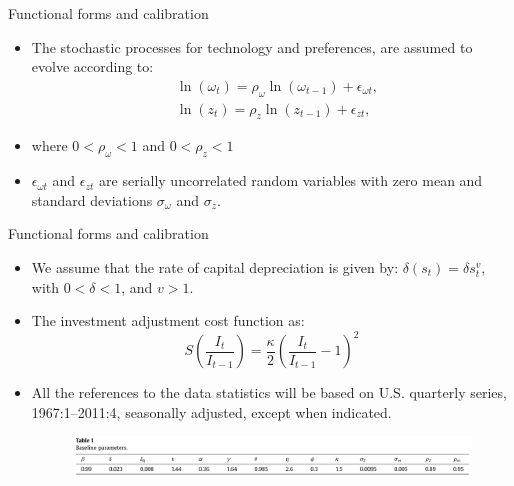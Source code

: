 \documentclass[fontset=windows,12pt,t,aspectratio=169]{beamer}
\begin{document}
\begin{frame}{Functional forms and calibration}
    \begin{itemize}
       \item The stochastic processes for technology and preferences, are assumed to evolve according to:
        \begin{align*}
            &\ln(\omega_t) = \rho_\omega \ln(\omega_{t-1}) + \epsilon_{\omega t}, \tag{9}
            \\
            &\ln(z_t) = \rho_z \ln(z_{t-1}) + \epsilon_{zt}, \tag{10}
        \end{align*}
       \item where $0 < \rho_\omega < 1$ and $0 < \rho_z < 1$
       \item $\epsilon_{\omega t} $ and $ \epsilon_{zt} $ are serially uncorrelated random variables with zero mean and standard deviations $\sigma_\omega$ and $\sigma_z $.
    \end{itemize}
\end{frame}

\begin{frame}{Functional forms and calibration}
    \begin{itemize}
       \item We assume that the rate of capital depreciation is given by: $\delta(s_t) = \delta s_{t}^{v} $, with \(0 < \delta < 1\), and \(v > 1\).
       \item The investment adjustment cost function as:
       \[S(\frac{I_t}{I_{t-1}}) = \frac{\kappa}{2}(\frac{I_t}{I_{t-1}} - 1)^2\]
       \item All the references to the data statistics will be based on U.S. quarterly series, 1967:1–2011:4, seasonally adjusted, except when indicated.
       \begin{figure}
         \begin{center}
         \includegraphics[width=12cm]{table/tab1.png}
         \end{center}
       \end{figure}
    \end{itemize}
\end{frame}
\end{document}

